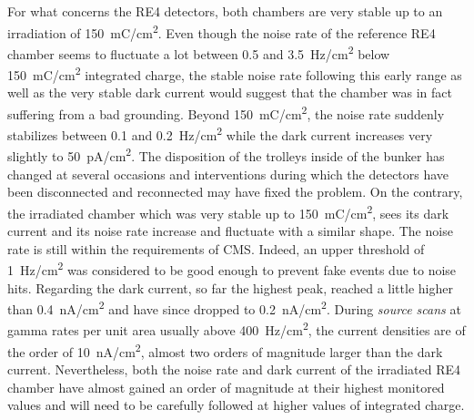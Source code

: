 	For what concerns the RE4 detectors, both chambers are very stable up to an irradiation of \SI{150}{mC/cm^2}. Even though the noise rate of the reference RE4 chamber seems to fluctuate a lot between 0.5 and \SI{3.5}{Hz/cm^2} below \SI{150}{mC/cm^2} integrated charge, the stable noise rate following this early range as well as the very stable dark current would suggest that the chamber was in fact suffering from a bad grounding. Beyond \SI{150}{mC/cm^2}, the noise rate suddenly stabilizes between 0.1 and \SI{0.2}{Hz/cm^2} while the dark current increases very slightly to \SI{50}{pA/cm^2}. The disposition of the trolleys inside of the bunker has changed at several occasions and interventions during which the detectors have been disconnected and reconnected may have fixed the problem. On the contrary, the irradiated chamber which was very stable up to \SI{150}{mC/cm^2}, sees its dark current and its noise rate increase and fluctuate with a similar shape. The noise rate is still within the requirements of CMS. Indeed, an upper threshold of \SI{1}{Hz/cm^2} was considered to be good enough to prevent fake events due to noise hits. Regarding the dark current, so far the highest peak, reached a little higher than \SI{0.4}{nA/cm^2} and have since dropped to \SI{0.2}{nA/cm^2}. During \textit{source scans} at gamma rates per unit area usually above \SI{400}{Hz/cm^2}, the current densities are of the order of \SI{10}{nA/cm^2}, almost two orders of magnitude larger than the dark current. Nevertheless, both the noise rate and dark current of the irradiated RE4 chamber have almost gained an order of magnitude at their highest monitored values and will need to be carefully followed at higher values of integrated charge.
	
